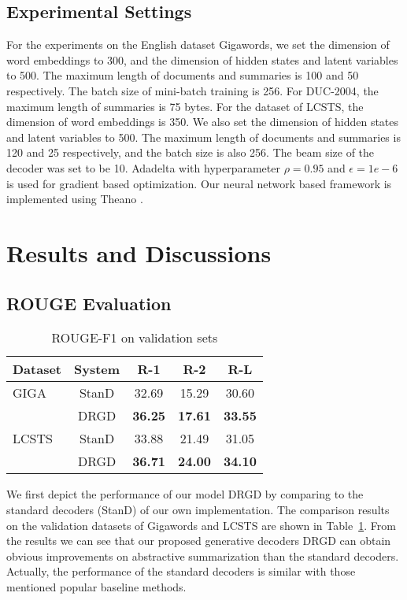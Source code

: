 \documentclass[11pt,letterpaper]{article}
\begin{document}
\subsection{Experimental Settings}
For the experiments on the English dataset Gigawords, we set the dimension of word embeddings to 300, and the dimension of hidden states and latent variables to 500.
The maximum length of documents and summaries is 100 and 50 respectively.
The batch size of mini-batch training is 256.
For DUC-2004, the maximum length of summaries is 75 bytes.
For the dataset of LCSTS, the dimension of word embeddings is 350.
We also set the dimension of hidden states and latent variables to 500.
The maximum length of documents and summaries is 120 and 25 respectively, and the batch size is also 256. 
The beam size of the decoder was set to be 10.
Adadelta \cite{schmidhuber2015deep} with hyperparameter $\rho = 0.95$ and $\epsilon = 1e-6$ is used for gradient based optimization.
Our neural network based framework is implemented using Theano \cite{2016arXiv160502688short}.





\section{Results and Discussions}

\subsection{ROUGE Evaluation}

\begin{table}[!htb]
	\centering
	\caption{ROUGE-F1 on validation sets}
	\label{tab:rouge-stand}
	\begin{tabular}{l c c c c}
		\hline
		\textbf{Dataset} & \textbf{System}  & \textbf{R-1} & \textbf{R-2} & \textbf{R-L} \\
		\hline
		GIGA  & StanD       & 32.69 & 15.29 & 30.60  \\
		& DRGD & \textbf{36.25} & \textbf{17.61} & \textbf{33.55}  \\
		\hline
		LCSTS & StanD       & 33.88 & 21.49 & 31.05  \\
		& DRGD      & \textbf{36.71} & \textbf{24.00} & \textbf{34.10}  \\
		\hline
	\end{tabular}
\end{table}

We first depict the performance of our model DRGD by comparing to the standard decoders (StanD) of our own implementation.
The comparison results on the validation datasets of Gigawords and LCSTS are shown in Table~\ref{tab:rouge-stand}.
From the results we can see that our proposed generative decoders DRGD can obtain obvious improvements on abstractive summarization than the standard decoders.
Actually, the performance of the standard decoders is similar with those mentioned popular baseline methods.
\end{document}
